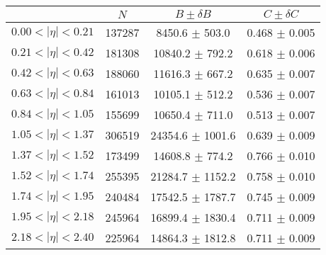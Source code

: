\begin{tabular}{lccc}
\hline
    &   $N$   & $B \pm \delta B$  &  $C \pm \delta C$ \\
\hline
$0.00 < |\eta| <0.21$          & 137287     & 8450.6     $\pm$ 503.0 & 0.468      $\pm$ 0.005 \\
$0.21 < |\eta| <0.42$          & 181308     & 10840.2    $\pm$ 792.2 & 0.618      $\pm$ 0.006 \\
$0.42 < |\eta| <0.63$          & 188060     & 11616.3    $\pm$ 667.2 & 0.635      $\pm$ 0.007 \\
$0.63 < |\eta| <0.84$          & 161013     & 10105.1    $\pm$ 512.2 & 0.536      $\pm$ 0.007 \\
$0.84 < |\eta| <1.05$          & 155699     & 10650.4    $\pm$ 711.0 & 0.513      $\pm$ 0.007 \\
$1.05 < |\eta| <1.37$          & 306519     & 24354.6    $\pm$ 1001.6 & 0.639      $\pm$ 0.009 \\
$1.37 < |\eta| <1.52$          & 173499     & 14608.8    $\pm$ 774.2 & 0.766      $\pm$ 0.010 \\
$1.52 < |\eta| <1.74$          & 255395     & 21284.7    $\pm$ 1152.2 & 0.758      $\pm$ 0.010 \\
$1.74 < |\eta| <1.95$          & 240484     & 17542.5    $\pm$ 1787.7 & 0.745      $\pm$ 0.009 \\
$1.95 < |\eta| <2.18$          & 245964     & 16899.4    $\pm$ 1830.4 & 0.711      $\pm$ 0.009 \\
$2.18 < |\eta| <2.40$          & 225964     & 14864.3    $\pm$ 1812.8 & 0.711      $\pm$ 0.009 \\
\hline
\end{tabular}
